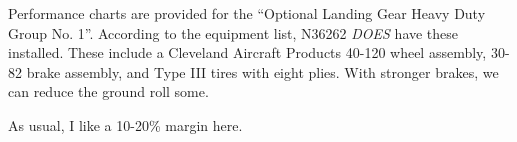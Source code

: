 Performance charts are provided for the ``Optional Landing Gear Heavy Duty Group No. 1''. According to the equipment list, N36262 \emph{DOES} have these installed. These include a Cleveland Aircraft Products 40-120 wheel assembly, 30-82 brake assembly, and Type III tires with eight plies. With stronger brakes, we can reduce the ground roll some.

As usual, I like a 10-20\% margin here.












